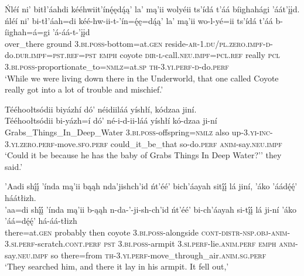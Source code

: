\ea\label{ex:text4-6-4}
Ńléí ni’ bitł’áahdi kééhwiit’ínę́ędą́ą’ la’ mą’ii wolyéii ts’ídá t’áá bíighahági ’áát’įįd.\\
\gll ńléí	ni’	bi-tł’áah=di	kéé-hw-ii-t-’ín=ę́ę=dą́ą’	la’	mą’ii	wo-l-yé=ii	ts’ídá	t’áá	b-íighah=á=gi	’á-áá-t-’įįd\\
     over\_there	ground	3.\textsc{bi}.\textsc{poss}-bottom=at.\textsc{gen}	reside-\textsc{ar}-1.\textsc{du}/\textsc{pl}.\textsc{zero}.\textsc{impf}-\textsc{d}-do.\textsc{dur}.\textsc{impf}=\textsc{pst}.\textsc{ref}=\textsc{pst}	\textsc{emph}	coyote	\textsc{dir}-\textsc{l}-call.\textsc{neu}.\textsc{impf}=\textsc{pcl}.\textsc{ref}	really	\textsc{pcl}	3.\textsc{bi}.\textsc{poss}-proportionate\_to=\textsc{nmlz}=at.\textsc{sp}	\textsc{th}-3.\textsc{yi}.\textsc{perf}-\textsc{d}-do.\textsc{perf}\\
\glt `While we were living down there in the Underworld, that one called Coyote really got into a lot of trouble and mischief.'
\z

\ea\label{ex:text4-6-5}
Tééhoołtsódii biyázhí dó’ néidiiláá yíshłí, kódzaa jiní.\\
\gll Tééhoołtsódii	bi-yázh=í	dó’	né-i-d-ii-láá	yíshłí	kó-dzaa	ji-ní\\
     Grabs\_Things\_In\_Deep\_Water	3.\textsc{bi}.\textsc{poss}-offspring=\textsc{nmlz}	also	up-3.\textsc{yi}-\textsc{inc}-3.\textsc{yi}.\textsc{zero}.\textsc{perf}-move.\textsc{sfo}.\textsc{perf}	could\_it\_be\_that	so-do.\textsc{perf}	\textsc{anim}-say.\textsc{neu}.\textsc{impf}\\
\glt `Could it be because he has the baby of Grabs Things In Deep Water?'' they said.'
\z

\ea\label{ex:text4-6-6}
’Aadi shį́į́ ’índa mą’ii bąąh nda’jishch’id ńt’éé’ bich’áayah sitį́į́ lá jiní, ’áko ’áádę́ę́’ háátłizh.\\
\gll ’aa=di	shį́į́	’índa	mą’ii	b-ąąh	n-da-’-ji-sh-ch’id	ńt’éé’	bi-ch’áayah	si-tį́į́	lá	ji-ní	’áko	’áá=dę́ę́’	há-áá-tłizh\\
     there=at.\textsc{gen}	probably	then	coyote	3.\textsc{bi}.\textsc{poss}-alongside	\textsc{cont}-\textsc{distr}-\textsc{nsp}.\textsc{obj}-\textsc{anim}-3.\textsc{si}.\textsc{perf}-scratch.\textsc{cont}.\textsc{perf}	\textsc{pst}	3.\textsc{bi}.\textsc{poss}-armpit	3.\textsc{si}.\textsc{perf}-lie.\textsc{anim}.\textsc{perf}	\textsc{emph}	\textsc{anim}-say.\textsc{neu}.\textsc{impf}	so	there=from	\textsc{th}-3.\textsc{yi}.\textsc{perf}-move\_through\_air.\textsc{anim}.\textsc{sg}.\textsc{perf}\\
\glt `They searched him, and there it lay in his armpit. It fell out,'
\z

